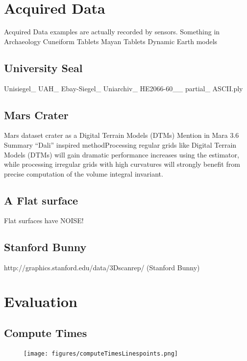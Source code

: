 \section{Acquired Data}
Acquired Data examples are actually recorded by sensors.
Something in Archaeology
Cuneiform Tablets
Mayan Tablets
Dynamic Earth models

\subsection{University Seal}
Unisiegel\_\- UAH\_\- Ebay-Siegel\_\- Uniarchiv\_\- HE2066-60\_\_\- partial\_\- ASCII.ply

\subsection{Mars Crater}
Mars dataset crater as a Digital Terrain Models (DTMs) Mention in Mara 3.6 
Summary “Dali” inspired methodProcessing regular grids like Digital Terrain 
Models (DTMs) will gain dramatic performance increases using the estimator, 
while processing irregular grids with high curvatures will strongly benefit 
from precise computation of the volume integral invariant.~\cite[p.~143]{Mara12}

\subsection{A Flat surface}
Flat surfaces have NOISE!

\subsection{Stanford Bunny}
http://graphics.stanford.edu/data/3Dscanrep/ (Stanford Bunny)



\section{Evaluation}
\subsection{Compute Times}

\begin{figure}[ht]
	\centering
	\texttt{[image: figures/computeTimesLinespoints.png]}
\end{figure}

